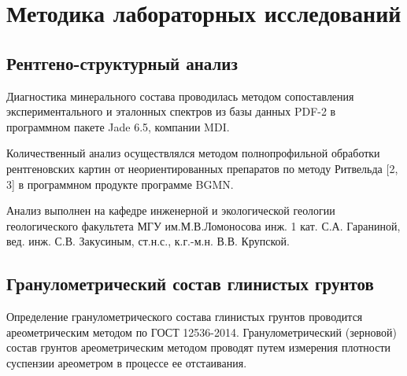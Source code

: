 \chapter{Методика лабораторных исследований}\label{ch:ch6}

\section{Рентгено-структурный анализ}


Диагностика минерального состава проводилась методом сопоставления экспериментального и эталонных 
спектров из базы данных PDF-2 в программном пакете Jade 6.5, компании MDI.

Количественный анализ осуществлялся методом полнопрофильной обработки рентгеновских 
картин от неориентированных препаратов по методу Ритвельда [2, 3] в программном продукте программе BGMN.

Анализ выполнен на кафедре инженерной и экологической геологии геологического факультета МГУ им.М.В.Ломоносова
инж. 1 кат. С.А. Гараниной, вед. инж. С.В. Закусиным, ст.н.с., к.г.-м.н. В.В. Крупской.

\section{Гранулометрический состав глинистых грунтов}

Определение гранулометрического состава глинистых грунтов проводится ареометрическим методом 
по ГОСТ 12536-2014. Гранулометрический (зерновой) состав грунтов
ареометрическим методом проводят путем измерения плотности суспензии
ареометром в процессе ее отстаивания. 

